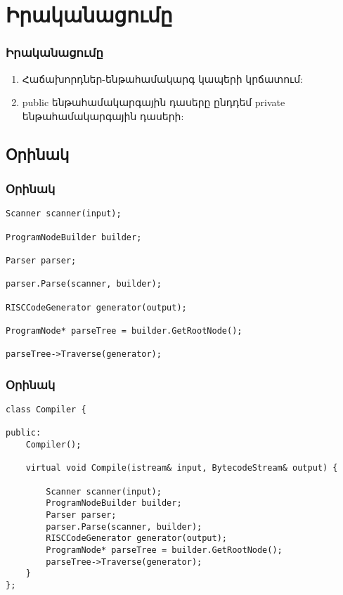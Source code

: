 \documentclass{beamer}
\begin{document}
\section{Իրականացումը}
\begin{frame}\frametitle{Իրականացումը}
\begin{enumerate}
    \item Հաճախորդներ-ենթահամակարգ կապերի կրճատում: \vfill
    \item public ենթահամակարգային դասերը ընդդեմ  private ենթահամակարգային դասերի:
\end{enumerate}
\end{frame}

\subsection{Օրինակ}
\begin{frame}[fragile]\frametitle{Օրինակ}
\begin{english}
\begin{verbatim}
Scanner scanner(input);

ProgramNodeBuilder builder;

Parser parser;

parser.Parse(scanner, builder);

RISCCodeGenerator generator(output);

ProgramNode* parseTree = builder.GetRootNode();

parseTree->Traverse(generator);
\end{verbatim}
\end{english}
\end{frame}
\begin{frame}[fragile]\frametitle{Օրինակ}
\begin{english}
\begin{verbatim}
class Compiler {

public:
    Compiler();

    virtual void Compile(istream& input, BytecodeStream& output) {

        Scanner scanner(input);
        ProgramNodeBuilder builder;
        Parser parser;
        parser.Parse(scanner, builder);
        RISCCodeGenerator generator(output);
        ProgramNode* parseTree = builder.GetRootNode();
        parseTree->Traverse(generator);
    }
};
\end{verbatim}
\end{english}
\end{frame}
\end{document}
